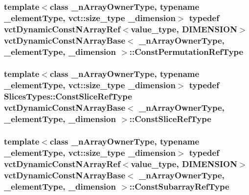 \subsubsection[{Const\+Permutation\+Ref\+Type}]{\setlength{\rightskip}{0pt plus 5cm}template$<$class \+\_\+n\+Array\+Owner\+Type, typename \+\_\+element\+Type, vct\+::size\+\_\+type \+\_\+dimension$>$ typedef {\bf vct\+Dynamic\+Const\+N\+Array\+Ref}$<$value\+\_\+type, {\bf D\+I\+M\+E\+N\+S\+I\+O\+N}$>$ {\bf vct\+Dynamic\+Const\+N\+Array\+Base}$<$ \+\_\+n\+Array\+Owner\+Type, \+\_\+element\+Type, \+\_\+dimension $>$\+::{\bf Const\+Permutation\+Ref\+Type}}\label{classvct_dynamic_const_n_array_base_a412fcb88d50ea2e1d809efab113968fc}
\hypertarget{classvct_dynamic_const_n_array_base_ad4a09eb0789ba4c5b8d799fbe0ee3d79}{}
\subsubsection[{Const\+Slice\+Ref\+Type}]{\setlength{\rightskip}{0pt plus 5cm}template$<$class \+\_\+n\+Array\+Owner\+Type, typename \+\_\+element\+Type, vct\+::size\+\_\+type \+\_\+dimension$>$ typedef Slices\+Types\+::\+Const\+Slice\+Ref\+Type {\bf vct\+Dynamic\+Const\+N\+Array\+Base}$<$ \+\_\+n\+Array\+Owner\+Type, \+\_\+element\+Type, \+\_\+dimension $>$\+::{\bf Const\+Slice\+Ref\+Type}}\label{classvct_dynamic_const_n_array_base_ad4a09eb0789ba4c5b8d799fbe0ee3d79}
\hypertarget{classvct_dynamic_const_n_array_base_a4b3508630e409eda4f0d2f55d17d89a4}{}
\subsubsection[{Const\+Subarray\+Ref\+Type}]{\setlength{\rightskip}{0pt plus 5cm}template$<$class \+\_\+n\+Array\+Owner\+Type, typename \+\_\+element\+Type, vct\+::size\+\_\+type \+\_\+dimension$>$ typedef {\bf vct\+Dynamic\+Const\+N\+Array\+Ref}$<$value\+\_\+type, {\bf D\+I\+M\+E\+N\+S\+I\+O\+N}$>$ {\bf vct\+Dynamic\+Const\+N\+Array\+Base}$<$ \+\_\+n\+Array\+Owner\+Type, \+\_\+element\+Type, \+\_\+dimension $>$\+::{\bf Const\+Subarray\+Ref\+Type}}\label{classvct_dynamic_const_n_array_base_a4b3508630e409eda4f0d2f55d17d89a4}
\hypertarget{classvct_dynamic_const_n_array_base_a0d7eee16dd05c2f5757640b3617cac5d}{}
